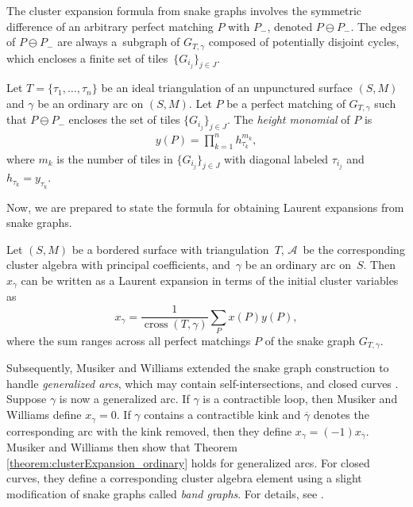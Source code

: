 The cluster expansion formula from snake graphs involves the symmetric difference of an arbitrary perfect matching $P$ with $P_{-}$, denoted $P \ominus P_{-}$. The edges of $P \ominus P_{-}$ are always a~subgraph of $G_{T,\gamma}$ composed of potentially disjoint cycles, which encloses a finite set of tiles~$\{ G_{i_j} \}_{j \in J}$.

\begin{Definition}
Let $T = \{ \tau_1, \dots, \tau_n \}$ be an ideal triangulation of an unpunctured surface $(S,M)$ and $\gamma$ be an ordinary arc on $(S,M)$. Let $P$ be a perfect matching of $G_{T,\gamma}$ such that $P \ominus P_{-}$ encloses the set of tiles $\{ G_{i_j} \}_{j \in J}$. The \emph{height monomial} of $P$ is
\begin{align*}
y(P) = \prod_{k=1}^n h_{\tau_{k}}^{m_k},
\end{align*}
where $m_k$ is the number of tiles in $\{G_{i_j} \}_{j \in J}$ with diagonal labeled $\tau_{i_j}$ and $h_{\tau_k} = y_{\tau_k}$.
\end{Definition}

Now, we are prepared to state the formula for obtaining Laurent expansions from snake graphs.

\begin{Theorem}\label{theorem:clusterExpansion_ordinary}
Let $(S,M)$ be a bordered surface with triangulation~$T$, $\mathcal{A}$~be the corresponding cluster algebra with principal coefficients, and~$\gamma$ be an ordinary arc on~$S$. Then $x_\gamma$ can be written as a Laurent expansion in terms of the initial cluster variables as
\[ x_\gamma = \frac{1}{\operatorname{cross}(T,\gamma)}\sum_P x(P)y(P), \]
where the sum ranges across all perfect matchings $P$ of the snake graph $G_{T,\gamma}$.
\end{Theorem}

Subsequently, Musiker and Williams extended the snake graph construction to handle \emph{generalized arcs}, which may contain self-intersections, and closed curves \cite{MW}. Suppose $\gamma$ is now a generalized arc. If $\gamma$ is a contractible loop, then Musiker and Williams define $x_\gamma = 0$. If $\gamma$ contains a contractible kink and $\overline{\gamma}$ denotes the corresponding arc with the kink removed, then they define $x_\gamma = (-1)x_{\overline{\gamma}}$. Musiker and Williams then show that Theorem \ref{theorem:clusterExpansion_ordinary} holds for generalized arcs. For closed curves, they define a corresponding cluster algebra element using a slight modification of snake graphs called \emph{band graphs}. For details, see \cite[Section~3]{MW}.

